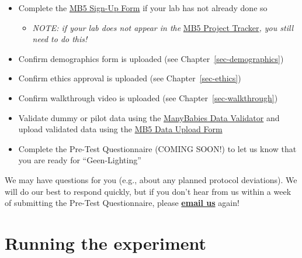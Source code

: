 \documentclass[
  letterpaper,
  DIV=11,
  numbers=noendperiod,
  oneside]{scrreprt}
\providecommand{\tightlist}{%
  \setlength{\itemsep}{0pt}\setlength{\parskip}{0pt}}
\begin{document}
\begin{itemize}
\tightlist
\item
  Complete the
  \href{https://airtable.com/appRoqMKzcK3NsXt4/pag99dsjlXiM24ZnB/form}{MB5
  Sign-Up Form} if your lab has not already done so

  \begin{itemize}
  \tightlist
  \item
    \emph{NOTE: if your lab does not appear in the}
    \href{https://manybabies.org/mb5-tracker}{MB5 Project
    Tracker}\emph{, you still need to do this!}
  \end{itemize}
\item
  Confirm demographics form is uploaded (see
  Chapter~\ref{sec-demographics})
\item
  Confirm ethics approval is uploaded (see Chapter~\ref{sec-ethics})
\item
  Confirm walkthrough video is uploaded (see
  Chapter~\ref{sec-walkthrough})
\item
  Validate dummy or pilot data using the
  \href{https://manybabies.org/validator/}{ManyBabies Data Validator}
  and upload validated data using the
  \href{https://airtable.com/appRoqMKzcK3NsXt4/pagTs6VPOhcjesYd5/form}{MB5
  Data Upload Form}
\item
  Complete the Pre-Test Questionnaire (COMING SOON!) to let us know that
  you are ready for ``Geen-Lighting''
\end{itemize}

\begin{tcolorbox}[enhanced jigsaw, coltitle=black, colframe=quarto-callout-important-color-frame, titlerule=0mm, colback=white, arc=.35mm, toprule=.15mm, left=2mm, colbacktitle=quarto-callout-important-color!10!white, opacityback=0, bottomtitle=1mm, title=\textcolor{quarto-callout-important-color}{\faExclamation}\hspace{0.5em}{Wait until you receive an official go-ahead from Project Leads before
you begin testing!}, breakable, rightrule=.15mm, opacitybacktitle=0.6, toptitle=1mm, leftrule=.75mm, bottomrule=.15mm]

We may have questions for you (e.g., about any planned protocol
deviations). We will do our best to respond quickly, but if you don't
hear from us within a week of submitting the Pre-Test Questionnaire,
please \href{mailto:mb5@manybabies.org}{\textbf{email us}} again!

\end{tcolorbox}

\part{Running the experiment}
\end{document}
